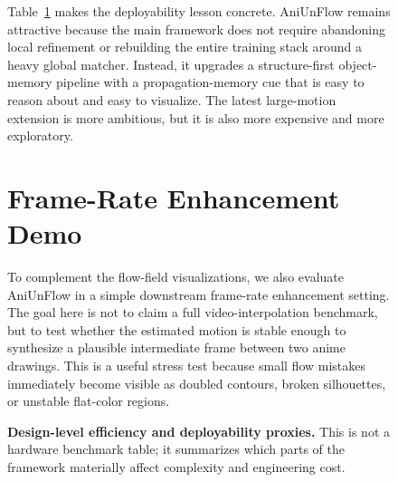 \begin{figure}[t]
\begin{table}[t]
\centering
\caption{\textbf{Design-level efficiency and deployability proxies.} This is not a hardware benchmark table; it summarizes which parts of the framework materially affect complexity and engineering cost.}
\label{tab:efficiency_proxy}
\end{table}

Table~\ref{tab:efficiency_proxy} makes the deployability lesson concrete. AniUnFlow remains attractive because the main framework does not require abandoning local refinement or rebuilding the entire training stack around a heavy global matcher. Instead, it upgrades a structure-first object-memory pipeline with a propagation-memory cue that is easy to reason about and easy to visualize. The latest large-motion extension is more ambitious, but it is also more expensive and more exploratory.

\section{Frame-Rate Enhancement Demo}

To complement the flow-field visualizations, we also evaluate AniUnFlow in a simple downstream frame-rate enhancement setting. The goal here is not to claim a full video-interpolation benchmark, but to test whether the estimated motion is stable enough to synthesize a plausible intermediate frame between two anime drawings. This is a useful stress test because small flow mistakes immediately become visible as doubled contours, broken silhouettes, or unstable flat-color regions.


\end{figure}
